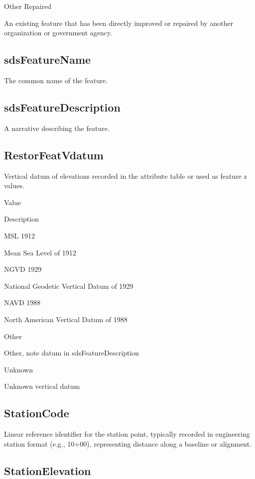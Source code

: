 \documentclass[
  letterpaper,
  DIV=11,
  numbers=noendperiod]{scrreprt}
\begin{document}
Other Repaired

An existing feature that has been directly improved or repaired by
another organization or government agency.

\subsection{sdsFeatureName}\label{sdsfeaturename-21}

The common name of the feature.

\subsection{sdsFeatureDescription}\label{sdsfeaturedescription-21}

A narrative describing the feature.

\subsection{RestorFeatVdatum}\label{restorfeatvdatum-21}

Vertical datum of elevations recorded in the attribute table or used as
feature z values.

Value

Description

MSL 1912

Mean Sea Level of 1912

NGVD 1929

National Geodetic Vertical Datum of 1929

NAVD 1988

North American Vertical Datum of 1988

Other

Other, note datum in sdsFeatureDescription

Unknown

Unknown vertical datum

\subsection{StationCode}\label{stationcode}

Linear reference identifier for the station point, typically recorded in
engineering station format (e.g., 10+00), representing distance along a
baseline or alignment.

\subsection{StationElevation}\label{stationelevation}
\end{document}
